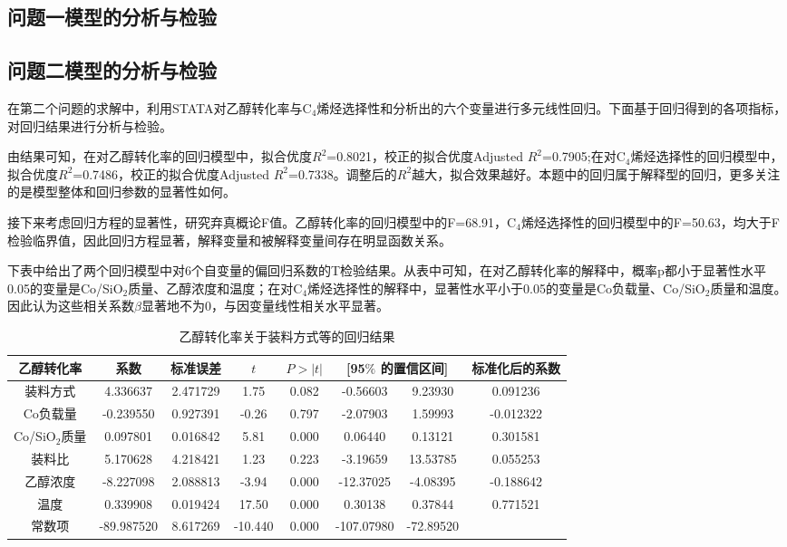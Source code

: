 \documentclass[a4paper,10.5pt]{ctexart}
\begin{document}
\subsection{问题一模型的分析与检验}


\subsection{问题二模型的分析与检验}
\par 在第二个问题的求解中，利用STATA对乙醇转化率与C$_4$烯烃选择性和分析出的六个变量进行多元线性回归。下面基于回归得到的各项指标，对回归结果进行分析与检验。
\par 由结果可知，在对乙醇转化率的回归模型中，拟合优度$R^2$=0.8021，校正的拟合优度Adjusted $R^2$=0.7905;在对C$_4$烯烃选择性的回归模型中，拟合优度$R^2$=0.7486，校正的拟合优度Adjusted $R^2$=0.7338。调整后的$R^2$越大，拟合效果越好。本题中的回归属于解释型的回归，更多关注的是模型整体和回归参数的显著性如何。
\par 接下来考虑回归方程的显著性，研究弃真概论F值。乙醇转化率的回归模型中的F=68.91，C$_4$烯烃选择性的回归模型中的F=50.63，均大于F检验临界值，因此回归方程显著，解释变量和被解释变量间存在明显函数关系。
\par 下表中给出了两个回归模型中对6个自变量的偏回归系数的T检验结果。从表中可知，在对乙醇转化率的解释中，概率p都小于显著性水平0.05的变量是Co/SiO$_2$质量、乙醇浓度和温度；在对C$_4$烯烃选择性的解释中，显著性水平小于0.05的变量是Co负载量、Co/SiO$_2$质量和温度。因此认为这些相关系数$\beta$显著地不为0，与因变量线性相关水平显著。
\begin{table}[htbp]
  \centering
  \caption{乙醇转化率关于装料方式等的回归结果}
    \begin{tabular}{cccccccc}
    \toprule[2pt]
    乙醇转化率 & 系数 & 标准误差  &  $t$    & $P>|t|$ & \multicolumn{2}{c}{ [95$\%$ 的置信区间]} & 标准化后的系数 \\
    \midrule
    装料方式  & 4.336637  & 2.471729  & 1.75  & 0.082  & -0.56603  & 9.23930  & 0.091236  \\
     Co负载量 & -0.239550  & 0.927391  & -0.26  & 0.797  & -2.07903  & 1.59993  & -0.012322  \\
     Co/SiO$_2$质量  & 0.097801  & 0.016842  & 5.81  & 0.000  & 0.06440  & 0.13121  & 0.301581  \\
     装料比  & 5.170628  & 4.218421  & 1.23  & 0.223  & -3.19659  & 13.53785  & 0.055253  \\
     乙醇浓度  & -8.227098  & 2.088813  & -3.94  & 0.000  & -12.37025  & -4.08395  & -0.188642  \\
     温度   & 0.339908  & 0.019424  & 17.50  & 0.000  & 0.30138  & 0.37844  & 0.771521  \\
     常数项  & -89.987520  & 8.617269  & -10.440  & 0.000  & -107.07980  & -72.89520  &  \\
    \bottomrule[2pt]
    \end{tabular}%
  \label{tab:addlabel}%
\end{table}%
\end{document}
